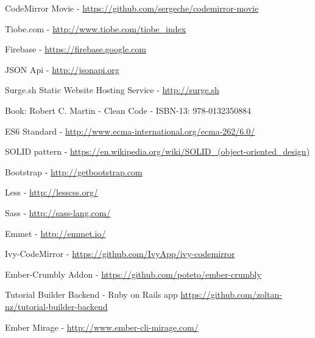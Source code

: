 \documentclass[11pt, a4paper, oneside, openright, medskipamount]{report}
\begin{document}
\begin{thebibliography}{9}

CodeMirror Movie - \url{https://github.com/sergeche/codemirror-movie}

Tiobe.com - \url{http://www.tiobe.com/tiobe_index}

Firebase - \url{https://firebase.google.com}

JSON Api - \url{http://jsonapi.org}

Surge.sh Static Website Hosting Service - \url{http://surge.sh}

Book: Robert C. Martin - Clean Code - ISBN-13: 978-0132350884

ES6 Standard - \url{http://www.ecma-international.org/ecma-262/6.0/}

SOLID pattern - \url{https://en.wikipedia.org/wiki/SOLID_(object-oriented_design)}

Bootstrap - \url{http://getbootstrap.com}

Less - \url{http://lesscss.org/}

Sass - \url{http://sass-lang.com/}

Emmet - \url{http://emmet.io/}

Ivy-CodeMirror - \url{https://github.com/IvyApp/ivy-codemirror}

Ember-Crumbly Addon - \url{https://github.com/poteto/ember-crumbly}

Tutorial Builder Backend - Ruby on Rails app \url{https://github.com/zoltan-nz/tutorial-builder-backend}

Ember Mirage - \url{http://www.ember-cli-mirage.com/}

\end{thebibliography}

\end{document}
